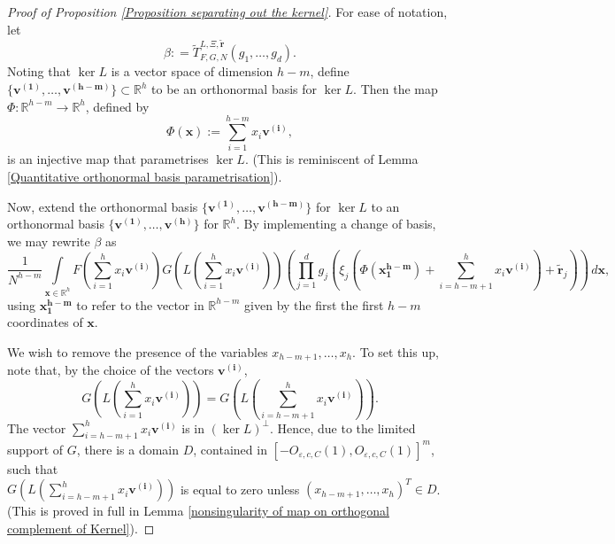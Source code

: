\documentclass[12pt,a4paper,twoside,reqno]{amsart}
\newcommand{\degen}{\operatorname{degen}}
\numberwithin{equation}{section}
\begin{document}
\begin{proof}[Proof of Proposition \ref{Proposition separating out the kernel}]

For ease of notation, let 
\[ \beta: = \widetilde{T}_{F,G,N}^{L,\Xi,\widetilde{\mathbf{r}}}(g_1,\dots,g_d).\]
Noting that $\ker L$ is a vector space of dimension $h-m$, define $\{\mathbf{v^{(1)}},\dots,\mathbf{v^{(h-m)}}\} \subset \mathbb{R}^h$ to be an orthonormal basis for $\ker L$. Then the map $\Phi:\mathbb{R}^{h-m} \longrightarrow \mathbb{R}^h$, defined by
\begin{equation}
\label{parametrise the kernel}
\Phi(\mathbf{x}) := \sum\limits_{i=1}^{h-m}x_i \mathbf{v}^{\mathbf{(i)}},
\end{equation}
\noindent is an injective map that parametrises $\ker L$. (This is reminiscent of Lemma \ref{Quantitative orthonormal basis parametrisation}). 


Now, extend the orthonormal basis $\{\mathbf{v^{(1)}},\dots,\mathbf{v^{(h-m)}}\}$ for $\ker L$ to an orthonormal basis $\{\mathbf{v^{(1)}},\dots,\mathbf{v^{(h)}}\}$ for $\mathbb{R}^h$. By implementing a change of basis, we may rewrite $\beta$ as
\begin{equation}
\label{separating out the kernel}
\frac{1}{N^{h-m}} \int\limits_{\mathbf{x}\in \mathbb{R}^h} F(\sum\limits_{i=1}^{h}x_i\mathbf{v^{(i)}})G(L(\sum\limits_{i=1}^{h}x_i\mathbf{v^{(i)}}))(\prod\limits_{j=1}^{d} g_j(\xi_j(\Phi(\mathbf{x_1^{h-m}})+\sum\limits_{i=h-m+1}^{h} x_i \mathbf{v}^{\mathbf{(i)}})+ \widetilde{\mathbf{r}}_j)) \, d\mathbf{x},
\end{equation}
\noindent using $\mathbf{x_1^{h-m}}$ to refer to the vector in $\mathbb{R}^{h-m}$ given by the first the first $h-m$ coordinates of $\mathbf{x}$.


We wish to remove the presence of the variables $x_{h-m+1},\dots,x_{h}$. To set this up, note that, by the choice of the vectors $\mathbf{v^{(i)}}$, $$G(L(\sum\limits_{i=1}^{h}x_i\mathbf{v^{(i)}})) = G(L(\sum\limits_{i=h-m+1}^{h}x_i\mathbf{v^{(i)}})). $$ The vector $\sum_{i=h-m+1}^{h}x_i\mathbf{v^{(i)}}$ is in $(\ker L)^{\perp}$. Hence, due to the limited support of $G$, there is a domain $D$, contained in $[-O_{\varepsilon,c,C}(1), O_{\varepsilon,c,C}(1)]^m$, such that \\$G(L(\sum_{i=h-m+1}^{h}x_i\mathbf{v^{(i)}}))$ is equal to zero unless $(x_{h-m+1},\dots,x_h)^T\in D$. (This is proved in full in Lemma \ref{nonsingularity of map on orthogonal complement of Kernel}).


\end{proof}
\end{document}

